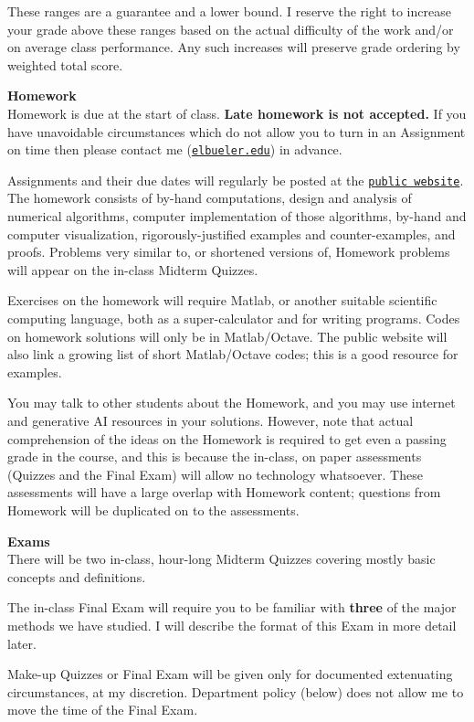 \documentclass[12pt]{article}
\renewcommand{\emph}[1]{\textsf{\textbf{#1}}}
\newcommand{\localhead}[1]{\par\smallskip\textbf{#1} \smallskip\nobreak\\}%
\def\heading#1{\localhead{\large\emph{#1}}}
\begin{document}
These ranges are a guarantee and a lower bound.  I reserve the right to increase your grade above these ranges based on the actual difficulty of the work and/or on average class performance.  Any such increases will preserve grade ordering by weighted total score.


\heading{Homework}
Homework is due at the start of class.  \emph{Late homework is not accepted.}  If you have unavoidable circumstances which do not allow you to turn in an Assignment on time then please contact me (\href{mailto:elbueler@alaska.edu}{\texttt{elbueler\@@alaska.edu}}) in advance.

Assignments and their due dates will regularly be posted at the \href{https://bueler.github.io/nla/}{\texttt{public website}}.  The homework consists of by-hand computations, design and analysis of numerical algorithms, computer implementation of those algorithms, by-hand and computer visualization, rigorously-justified examples and counter-examples, and proofs.  Problems very similar to, or shortened versions of, Homework problems will appear on the in-class Midterm Quizzes.

Exercises on the homework will require Matlab, or another suitable scientific computing language, both as a super-calculator and for writing programs.  Codes on homework solutions will only be in Matlab/Octave.  The public website will also link a growing list of short Matlab/Octave codes; this is a good resource for examples.

You may talk to other students about the Homework, and you may use internet and generative AI resources in your solutions.  However, note that actual comprehension of the ideas on the Homework is required to get even a passing grade in the course, and this is because the in-class, on paper assessments (Quizzes and the Final Exam) will allow no technology whatsoever.  These assessments will have a large overlap with Homework content; questions from Homework will be duplicated on to the assessments.

\heading{Exams}
There will be two in-class, hour-long Midterm Quizzes covering mostly basic concepts and definitions.

The in-class Final Exam will require you to be familiar with \textbf{three} of the major methods we have studied.  I will describe the format of this Exam in more detail later.

Make-up Quizzes or Final Exam will be given only for documented extenuating circumstances, at my discretion.  Department policy (below) does not allow me to move the time of the Final Exam.
\end{document}
